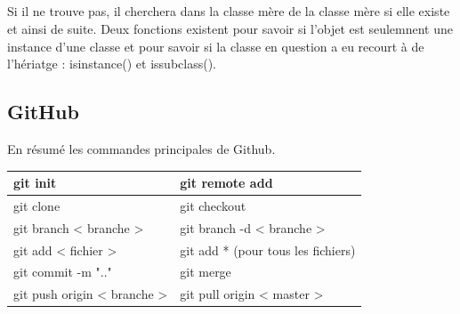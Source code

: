 \documentclass[a4paper, 12pt, twoside]{article}
\begin{document}
\subparagraph{}{Si il ne trouve pas, il cherchera dans la classe mère de la classe mère si elle existe et ainsi de suite. Deux fonctions existent pour savoir si l'objet est seulemnent  une instance d'une classe et pour savoir si la classe en question a eu recourt à de l'hériatge : isinstance() et issubclass(). }

\subsection{GitHub}
En résumé les commandes principales de \textsf{Github}.
\begin{center}
\begin{tabular}{|l|l|}
\hline
git init & git remote add \\ \hline
git clone & git checkout \\ \hline
git branch < branche > &  git branch -d < branche > \\ \hline
git add < fichier > &  git add * (pour tous les fichiers) \\ \hline
git commit -m ".." &  git merge \\ \hline
git push origin < branche > & git pull origin < master >  \\ \hline
\end{tabular}
\end{center}
\newpage
\end{document}
